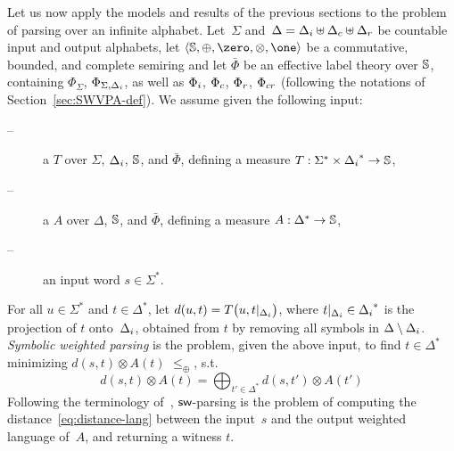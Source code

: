 Let us now apply the models and results of the previous sections %
to the problem of parsing over an infinite alphabet. %
%
%
Let~$\Sigma$
and~$\Delta = \Deltai \uplus \Deltac \uplus \Deltar$
be countable input and output alphabets,
let $\< \Semiring, \oplus, \zero, \otimes, \one>$ be a
commutative, bounded, and complete  semiring
and let $\bar\Phi$ be an effective label theory over $\mathbb{S}$,
containing $\Phi_\Sigma$, $\Phi_{\Sigma, \Deltai}$, as well as
$\Phii$, $\Phic$, $\Phir$, $\Phicr$
(following the notations of Section~\ref{sec:SWVPA-def}).
%
\noindent
We assume given the following input:
\begin{description}
\item[--] a \SWT $T$ over $\Sigma$, $\Deltai$, $\mathbb{S}$, and $\bar\Phi$,
defining a measure %
$T: \Sigma^* \times \Deltai^* \to \Semiring$,

\item[--] a \SWVPA $A$ over $\Delta$, $\mathbb{S}$, and $\bar\Phi$,
defining a measure $A: \Delta^* \to \mathbb{S}$,
\item[--] an input word $s \in \Sigma^*$.
\end{description}
%
For all $u \in \Sigma^*$ and $t \in \Delta^*$, let
\(d(u, t) = T\bigl(u, t|_\Deltai \bigr)\),
where $t|_\Deltai \in \Deltai^*$ is the projection of $t$ onto~$\Deltai$,
obtained from $t$ by removing all symbols in $\Delta \setminus \Deltai$.
%
\noindent
\emph{Symbolic weighted parsing} is the problem,
given the above input,
to find $t \in \Delta^*$ %
minimizing \( d(s, t) \otimes A(t)\)
\wrt $\leq_\oplus$,
\ie s.t. %
%
\begin{equation}\label{eq:distance-lang}
d(s, t) \otimes A(t) = \displaystyle\bigoplus_{t' \in \Delta^*} d(s, t') \otimes A(t')
\end{equation}
%
Following the terminology of~\cite{Mohri03EDWA},
$\textsf{sw}$-parsing is the problem of computing
the distance~\eqref{eq:distance-lang} between the input~$s$ and the output weighted language of~$A$,
and returning a witness $t$.

